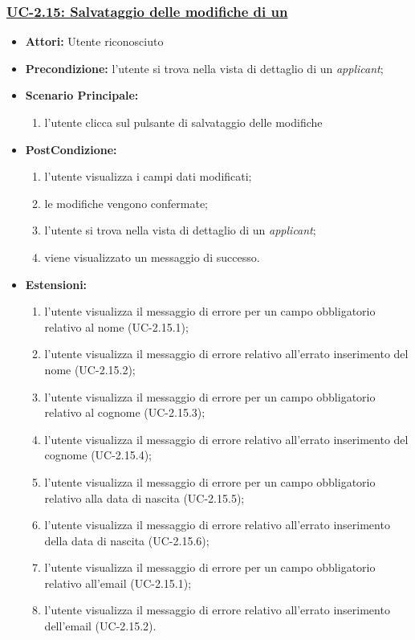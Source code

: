 \subsubsection{\underline{UC-2.15: Salvataggio delle modifiche di un \applicant}}
\begin{itemize}
	\item \textbf{Attori:} Utente riconosciuto
	\item \textbf{Precondizione:}  l'utente si trova nella vista di dettaglio di un \textit{applicant};
	\item \textbf{Scenario Principale:}
	\begin{enumerate}
		\item l'utente clicca sul pulsante di salvataggio delle modifiche
	\end{enumerate}
	\item \textbf{PostCondizione:} 
	\begin{enumerate}
		\item l'utente visualizza i campi dati modificati;
		\item le modifiche vengono confermate;
		\item l'utente si trova nella vista di dettaglio di un \textit{applicant};
		\item viene visualizzato un messaggio di successo.
	\end{enumerate}
	
	\item \textbf{Estensioni:} 
	\begin{enumerate}
		\item l'utente visualizza il messaggio di errore per un campo obbligatorio relativo al nome (UC-2.15.1);		
		\item l'utente visualizza il messaggio di errore relativo all'errato inserimento del nome (UC-2.15.2);
		\item l'utente visualizza il messaggio di errore per un campo obbligatorio relativo al cognome (UC-2.15.3);
		\item l'utente visualizza il messaggio di errore relativo all'errato inserimento del cognome (UC-2.15.4);
		\item l'utente visualizza il messaggio di errore per un campo obbligatorio relativo alla data di nascita (UC-2.15.5);		
		\item l'utente visualizza il messaggio di errore relativo all'errato inserimento della data di nascita (UC-2.15.6);	
		\item l'utente visualizza il messaggio di errore per un campo obbligatorio relativo all'email (UC-2.15.1);		
		\item l'utente visualizza il messaggio di errore relativo all'errato inserimento dell'email (UC-2.15.2).
	\end{enumerate}
\end{itemize}


